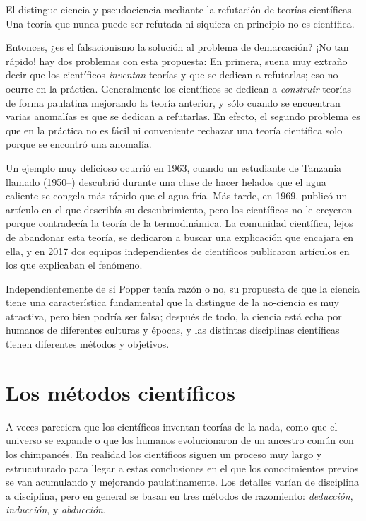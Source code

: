 \begin{remember}
    \label{rem:falsacionismo}
    El  distingue ciencia y pseudociencia mediante
    la refutación de teorías científicas.
    Una teoría que nunca puede ser refutada ni siquiera en principio no es
    científica.
\end{remember}

Entonces, ¿es el falsacionismo la solución al problema de demarcación?
¡No tan rápido! hay dos problemas con esta propuesta:
En primera, suena muy extraño decir que los científicos \emph{inventan}
teorías y que se dedican a refutarlas; eso no ocurre en la práctica.
Generalmente los científicos se dedican a \emph{construir} teorías de forma
paulatina mejorando la teoría anterior, y sólo cuando se encuentran varias
anomalías es que se dedican a refutarlas.
En efecto, el segundo problema es que en la práctica no es fácil ni conveniente
rechazar una teoría científica solo porque se encontró una anomalía.

Un ejemplo muy delicioso ocurrió en 1963, cuando un estudiante de Tanzania
llamado  (1950--) descubrió durante una
clase de hacer helados que el agua caliente se congela más rápido que el agua
fría.
Más tarde, en 1969, publicó un artículo en el que describía su
descubrimiento\cite{Mpemba1979}, pero los científicos no le creyeron porque
contradecía la teoría de la termodinámica.
La comunidad científica, lejos de abandonar esta teoría, se dedicaron a buscar
una explicación que encajara en ella, y en 2017 dos equipos independientes de
científicos publicaron artículos en los que explicaban el fenómeno.

Independientemente de si Popper tenía razón o no, su propuesta de que la ciencia
tiene una característica fundamental que la distingue de la no-ciencia es muy
atractiva, pero bien podría ser falsa; después de todo, la ciencia está echa por
humanos de diferentes culturas y épocas, y las distintas disciplinas científicas
tienen diferentes métodos y objetivos.

\section{Los métodos científicos}
\label{sec:losmetodoscientificos}

A veces pareciera que los científicos inventan teorías de la nada, como que el
universo se expande o que los humanos evolucionaron de un ancestro común con los
chimpancés.
En realidad los científicos siguen un proceso muy largo y estrucuturado para
llegar a estas conclusiones en el que los conocimientos previos se van
acumulando y mejorando paulatinamente.
Los detalles varían de disciplina a disciplina, pero en general se basan en tres
métodos de razomiento: \emph{deducción}, \emph{inducción}, y
\emph{abducción}.

